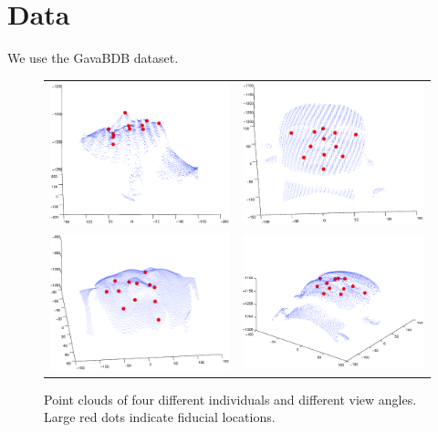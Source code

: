 \documentclass[runningheads]{llncs}
\begin{document}
\section{Data}
We use the GavaBDB\cite{moreno2004gavabdb} dataset.
\begin{figure}[ht]
\begin{tabular}{cc}
\includegraphics[width=.4\linewidth]{../resources/figures/face1.png} &
\includegraphics[width=.4\linewidth]{../resources/figures/face2.png} \\
\includegraphics[width=.4\linewidth]{../resources/figures/face3.png} &
\includegraphics[width=.4\linewidth]{../resources/figures/face4.png}
\end{tabular}
\caption{Point clouds of four different individuals and different view angles.  Large red dots indicate fiducial locations.}
\end{figure}
\end{document}

